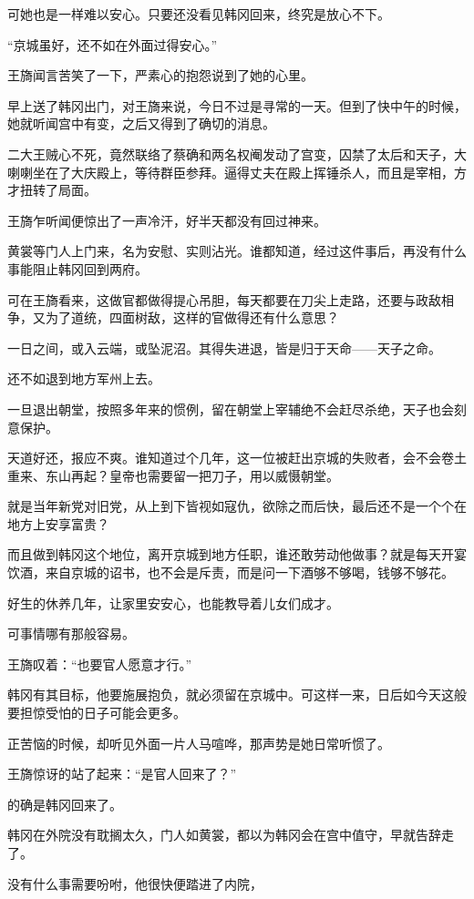 可她也是一样难以安心。只要还没看见韩冈回来，终究是放心不下。

“京城虽好，还不如在外面过得安心。”

王旖闻言苦笑了一下，严素心的抱怨说到了她的心里。

早上送了韩冈出门，对王旖来说，今日不过是寻常的一天。但到了快中午的时候，她就听闻宫中有变，之后又得到了确切的消息。

二大王贼心不死，竟然联络了蔡确和两名权阉发动了宫变，囚禁了太后和天子，大喇喇坐在了大庆殿上，等待群臣参拜。逼得丈夫在殿上挥锤杀人，而且是宰相，方才扭转了局面。

王旖乍听闻便惊出了一声冷汗，好半天都没有回过神来。

黄裳等门人上门来，名为安慰、实则沾光。谁都知道，经过这件事后，再没有什么事能阻止韩冈回到两府。

可在王旖看来，这做官都做得提心吊胆，每天都要在刀尖上走路，还要与政敌相争，又为了道统，四面树敌，这样的官做得还有什么意思？

一日之间，或入云端，或坠泥沼。其得失进退，皆是归于天命——天子之命。

还不如退到地方军州上去。

一旦退出朝堂，按照多年来的惯例，留在朝堂上宰辅绝不会赶尽杀绝，天子也会刻意保护。

天道好还，报应不爽。谁知道过个几年，这一位被赶出京城的失败者，会不会卷土重来、东山再起？皇帝也需要留一把刀子，用以威慑朝堂。

就是当年新党对旧党，从上到下皆视如寇仇，欲除之而后快，最后还不是一个个在地方上安享富贵？

而且做到韩冈这个地位，离开京城到地方任职，谁还敢劳动他做事？就是每天开宴饮酒，来自京城的诏书，也不会是斥责，而是问一下酒够不够喝，钱够不够花。

好生的休养几年，让家里安安心，也能教导着儿女们成才。

可事情哪有那般容易。

王旖叹着：“也要官人愿意才行。”

韩冈有其目标，他要施展抱负，就必须留在京城中。可这样一来，日后如今天这般要担惊受怕的日子可能会更多。

正苦恼的时候，却听见外面一片人马喧哗，那声势是她日常听惯了。

王旖惊讶的站了起来：“是官人回来了？”

的确是韩冈回来了。

韩冈在外院没有耽搁太久，门人如黄裳，都以为韩冈会在宫中值守，早就告辞走了。

没有什么事需要吩咐，他很快便踏进了内院，

